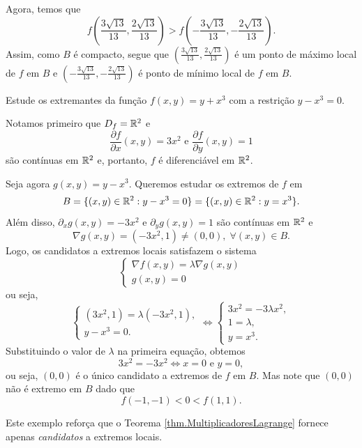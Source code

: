 \begin{example}
    Agora, temos que \[f\left( \frac{3\sqrt{13}}{13}, \frac{2\sqrt{13}}{13} \right) > f\left(  -\frac{3\sqrt{13}}{13}, -\frac{2\sqrt{13}}{13} \right).\] Assim, como \(B\) é compacto, segue que \(\left( \frac{3\sqrt{13}}{13}, \frac{2\sqrt{13}}{13} \right)\) é um ponto de máximo local de \(f\) em \(B\) e \(\left(  -\frac{3\sqrt{13}}{13}, -\frac{2\sqrt{13}}{13} \right)\) é ponto de mínimo local de \(f\) em \(B\).
\end{example}

\begin{example}
    Estude os extremantes da função \(f(x,y) = y + x^3\) com a restrição \(y - x^3 = 0\).

    Notamos primeiro que \(D_f = \mathbb{R}^2\) e \[\frac{\partial f}{\partial x}(x,y) = 3x^2 \text{ e } \frac{\partial f}{\partial y}(x,y) = 1\] são contínuas em \(\mathbb{R}^2\) e, portanto, \(f\) é diferenciável em \(\mathbb{R}^2\).

    Seja agora \(g(x,y) = y-x^3\). Queremos estudar os extremos de \(f\) em \[B = \{(x,y)\in\mathbb{R}^2 : y-x^3 = 0\} = \{(x,y)\in\mathbb{R}^2 : y = x^3\}.\] Além disso, \(\partial_x g(x,y) = -3x^2\) e \(\partial_y g(x,y) = 1\) são contínuas em \(\mathbb{R}^2\) e \[\nabla g(x,y) = (-3x^2, 1) \neq (0,0),\; \forall (x,y)\in B.\] Logo, os candidatos a extremos locais satisfazem o sistema \[\begin{cases}
        \nabla f(x,y) = \lambda \nabla g(x,y) \\
        g(x,y) = 0
    \end{cases}\] ou seja, \[\begin{cases}
        (3x^2,1) = \lambda (-3x^2,1),\\
        y-x^3 = 0.
    \end{cases} \Leftrightarrow \begin{cases}
        3x^2 = -3\lambda x^2, \\
        1 = \lambda, \\
        y = x^3.
    \end{cases}\] Substituindo o valor de \(\lambda\) na primeira equação, obtemos \[3x^2 = -3x^2 \Leftrightarrow x = 0 \text{ e } y=0,\] ou seja, \((0,0)\) é o único candidato a extremos de \(f\) em \(B\). Mas note que \((0,0)\) não é extremo em \(B\) dado que \[f(-1,-1) < 0 < f(1,1).\]

    Este exemplo reforça que o Teorema \ref{thm.MultiplicadoresLagrange} fornece apenas \textit{candidatos} a extremos locais.
\end{example}

